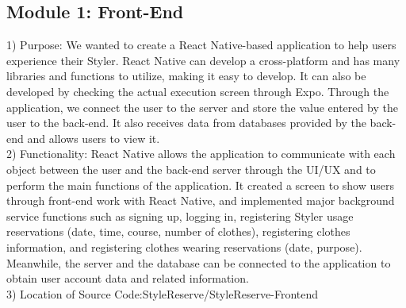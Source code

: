 \documentclass[conference]{IEEEtran}
\begin{document}
\newpage
\subsection{Module 1: Front-End}
1) Purpose: We wanted to create a React Native-based application to help users experience their Styler. React Native can develop a cross-platform and has many libraries and functions to utilize, making it easy to develop. It can also be developed by checking the actual execution screen through Expo. Through the application, we connect the user to the server and store the value entered by the user to the back-end. It also receives data from databases provided by the back-end and allows users to view it.\\

2) Functionality: React Native allows the application to communicate with each object between the user and the back-end server through the UI/UX and to perform the main functions of the application. It created a screen to show users through front-end work with React Native, and implemented major background service functions such as signing up, logging in, registering Styler usage reservations (date, time, course, number of clothes), registering clothes information, and registering clothes wearing reservations (date, purpose). Meanwhile, the server and the database can be connected to the application to obtain user account data and related information.\\

3) Location of Source Code:StyleReserve/StyleReserve-Frontend \\
\end{document}
